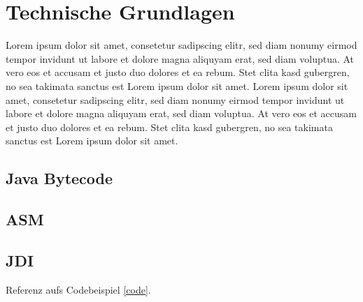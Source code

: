 
\chapter{Technische Grundlagen}

Lorem ipsum dolor sit amet, consetetur sadipscing elitr, sed diam nonumy eirmod tempor invidunt ut labore et dolore magna aliquyam erat, sed diam voluptua. At vero eos et accusam et justo duo dolores et ea rebum. Stet clita kasd gubergren, no sea takimata sanctus est Lorem ipsum dolor sit amet. Lorem ipsum dolor sit amet, consetetur sadipscing elitr, sed diam nonumy eirmod tempor invidunt ut labore et dolore magna aliquyam erat, sed diam voluptua. At vero eos et accusam et justo duo dolores et ea rebum. Stet clita kasd gubergren, no sea takimata sanctus est Lorem ipsum dolor sit amet.

\section{Java Bytecode} 

\section{ASM} 

\section{JDI} 


Referenz aufs Codebeispiel \ref{code}.


